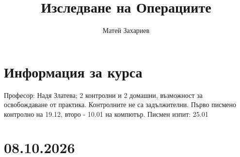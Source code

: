 \documentclass[12pt, a4paper]{article}
\title{Изследване на Операциите}
\author{Матей Захариев}
\date{}
\begin{document}
\maketitle

{\centering\section*{Информация за курса}}

Професор: Надя Златева;  2 контролни и 2 домашни, възможност за освобождаване от практика. Контролните не са задължителни. Първо писмено контролно на 19.12, второ - 10.01 на компютър. Писмен изпит: 25.01\\

{\centering\section*{08.10.2026}}
\end{document}
